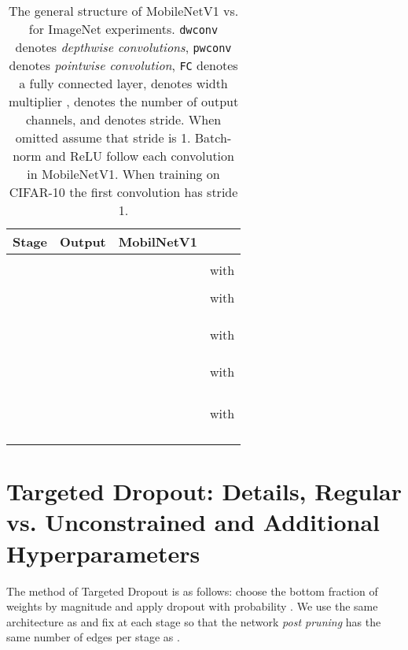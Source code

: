 \documentclass{article}
\newcommand*{\smn}{\text{MobileNetV1-DNW}}
\begin{document}
\begin{table}[H]
  \caption{The general structure of MobileNetV1 vs.  for ImageNet experiments. \texttt{dwconv} denotes \textit{depthwise convolutions}, \texttt{pwconv} denotes \textit{pointwise convolution}, \texttt{FC} denotes a fully connected layer,  denotes width multiplier \cite{mobilenetv1},  denotes the number of output channels, and  denotes stride. When omitted assume that stride is 1. Batch-norm \cite{batchnorm} and ReLU follow each convolution in MobileNetV1. When training on CIFAR-10 \cite{cifar} the first convolution has stride 1.}
  \label{tab:arch}
  \centering
\begin{tabular}{llll}
 \toprule
\textbf{Stage} & \textbf{Output} & \textbf{MobilNetV1} & \textbf{\smn}   \\
 \midrule
  &   &   &  \\
 \midrule
  &   &   &  with  \\
  &   &   &   \\
 \midrule
   &   &   &  with  \\
  &   &   &  \\
  &   &   &  \\
  &   &   &  \\
 \midrule
    &   &   &  with  \\
  &   &   &   \\
  &   &   &  \\
  &   &   &  \\
 \midrule
   &   &   &  with   \\
  &   &   &   \\ 
  &   & \multirow{3}{*}{}  &  \\
  &   &   &  \\
  &   &   &  \\
 \midrule
    &   &   &  with   \\
  &   &   &    \\
  &   &   &  \\
  &   &   &  \\
 \midrule
  &  &    & \\
\bottomrule
\end{tabular}
\end{table}

\section{Targeted Dropout: Details, Regular vs. Unconstrained and Additional Hyperparameters} \label{sec:td}

The method of Targeted Dropout is as follows: choose the bottom  fraction of weights by magnitude and apply dropout with probability . We use the same architecture as   and fix  at each stage so that the network \textit{post pruning} has the same number of edges per stage as  .
\end{document}
